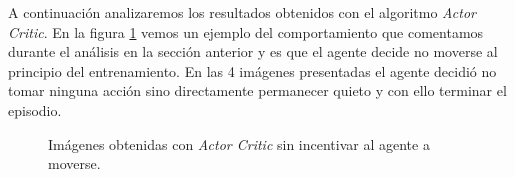 A continuación analizaremos los resultados obtenidos con el algoritmo \textit{Actor Critic}. En la figura \ref{fig-resultados-experimentos-actor-critic-no-movement} vemos un ejemplo del comportamiento que comentamos durante el análisis en la sección anterior y es que el agente decide no moverse al principio del entrenamiento. En las 4 imágenes presentadas el agente decidió no tomar ninguna acción sino directamente permanecer quieto y con ello terminar el episodio.
\medskip

\begin{figure}[H]
    \centering
	\hspace{0.05\linewidth}
	\hspace{0.05\linewidth}
	\hspace{0.05\linewidth}
    \caption[Imágenes obtenidas con \textit{Actor Critic} sin incentivar al agente a moverse]{Imágenes obtenidas con \textit{Actor Critic} sin incentivar al agente a moverse.}
    \label{fig-resultados-experimentos-actor-critic-no-movement}
\end{figure}

